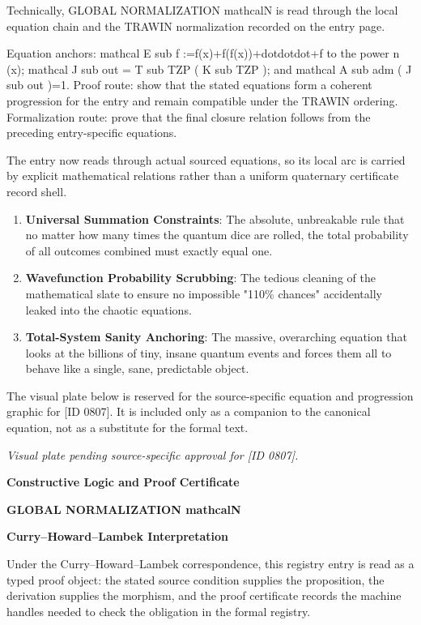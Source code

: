 Technically, GLOBAL NORMALIZATION mathcalN is read through the local equation chain and the TRAWIN normalization recorded on the entry page.

Equation anchors: mathcal E sub f :=f(x)+f(f(x))+dotdotdot+f to the power n (x); mathcal J sub out = T sub TZP ( K sub TZP ); and mathcal A sub adm ( J sub out )=1. Proof route: show that the stated equations form a coherent progression for the entry and remain compatible under the TRAWIN ordering. Formalization route: prove that the final closure relation follows from the preceding entry-specific equations.

The entry now reads through actual sourced equations, so its local arc is carried by explicit mathematical relations rather than a uniform quaternary certificate record shell.
\endgroup

\begin{enumerate}[leftmargin=1.6em,itemsep=6pt,topsep=4pt]
\item \textbf{Universal Summation Constraints}: The absolute, unbreakable rule that no matter how many times the quantum dice are rolled, the total probability of all outcomes combined must exactly equal one.
\item \textbf{Wavefunction Probability Scrubbing}: The tedious cleaning of the mathematical slate to ensure no impossible "110\% chances" accidentally leaked into the chaotic equations.
\item \textbf{Total-System Sanity Anchoring}: The massive, overarching equation that looks at the billions of tiny, insane quantum events and forces them all to behave like a single, sane, predictable object.
\end{enumerate}

\begingroup\footnotesize\sloppy
The visual plate below is reserved for the source-specific equation and progression graphic for [ID 0807]. It is included only as a companion to the canonical equation, not as a substitute for the formal text.
\par\endgroup
\begingroup\footnotesize\itshape
Visual plate pending source-specific approval for [ID 0807].
\par\endgroup

\clearpage
\begingroup\tzpsupportsetup
\noindent\textbf{\fontsize{10.8pt}{12.8pt}\selectfont [ID 0807] Constructive Logic and Proof Certificate}\par
\noindent\textbf{\fontsize{10pt}{12pt}\selectfont GLOBAL NORMALIZATION mathcalN}\par
\vspace{0.45em}
\begingroup
\footnotesize
\setlength{\parskip}{0.22em}
\setlength{\parindent}{0pt}
\noindent\textbf{Curry--Howard--Lambek Interpretation}\par
Under the Curry--Howard--Lambek correspondence, this registry entry is read as a typed proof
object: the stated source condition supplies the proposition, the derivation supplies the
morphism, and the proof certificate records the machine handles needed to check the obligation
in the formal registry.

